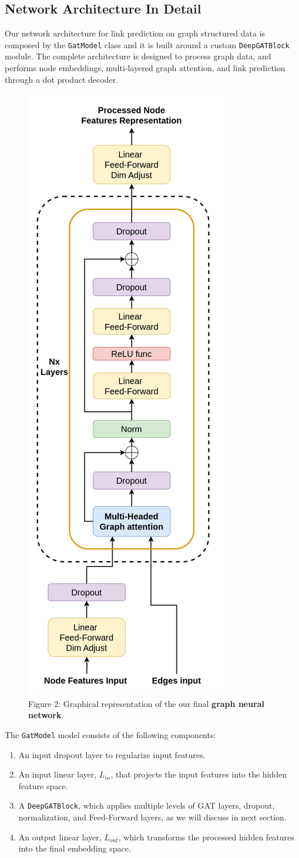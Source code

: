 \documentclass[11pt]{article}
\begin{document}
	\subsection{Network Architecture In Detail}
	Our network architecture for link prediction on graph structured data is composed by the \texttt{GatModel} class and it is built around a custom \texttt{DeepGATBlock} module.
	The complete architecture is designed to process graph data, and performs node embeddings, multi-layered graph attention, and link prediction through a dot product decoder.
	
	\begin{figure}[h] %
		\centering
		\label{figure_2}
		\includegraphics[height=0.8\textwidth]{images/custom_gnn_diagram.png}
		\caption{Figure 2: Graphical representation of the our final \textbf{graph neural network}.}
	\end{figure}
	
	The \texttt{GatModel} model consists of the following components:
	\begin{enumerate}
		\item An input dropout \cite{JMLR:v15:srivastava14a} layer to regularize input features.
		
		\item An input linear layer, $L_{in}$, that projects the input features into the hidden feature space.
		
		\item A \texttt{DeepGATBlock}, which applies multiple levels of GAT layers, dropout, normalization, and Feed-Forward layers, as we will discuss in next section.
		
		\item An output linear layer, $L_{out}$, which transforms the processed hidden features into the final embedding space.
	\end{enumerate}
	
\end{document}
